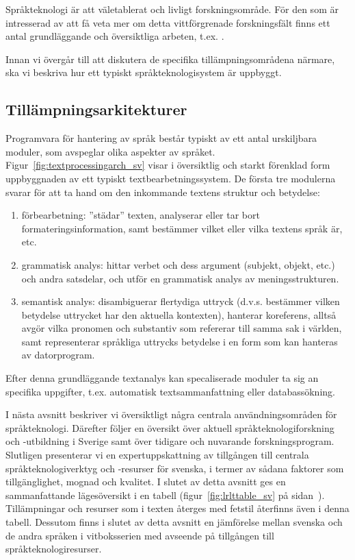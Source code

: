 \begin{multicols}{2}
Språkteknologi är att väletablerat och livligt forskningsområde. För
den som är intresserad av att få veta mer om detta vittförgrenade
forskningsfält finns ett antal grundläggande och översiktliga arbeten,
t.ex.
\cite{jurafsky-martin01,manning-schuetze1,lt-world1,lt-survey1}.

Innan vi övergår till att diskutera de specifika tillämpningsområdena
närmare, ska vi beskriva hur ett typiskt språkteknologisystem är
uppbyggt.


\subsection{Tillämpnings\-arkitekturer}

Programvara för hantering av språk består typiskt av ett antal
urskiljbara moduler, som avspeglar olika aspekter av
språket. Figur~\ref{fig:textprocessingarch_sv} visar i översiktlig och
starkt förenklad form uppbyggnaden av ett typiskt
textbearbetningssystem. De första tre modulerna svarar för att ta hand
om den inkommande textens struktur och betydelse: \\

\begin{enumerate}[itemsep=0pt,parsep=0pt]
\item förbearbetning: ''städar'' texten, analyserar eller tar bort
  formateringsinformation, samt bestämmer vilket eller vilka textens
  språk är, etc.
\item grammatisk analys: hittar verbet och dess argument (subjekt,
  objekt, etc.) och andra satsdelar, och utför en grammatisk analys av
  meningsstrukturen.
\item semantisk analys: disambiguerar flertydiga uttryck
  (d.v.s. bestämmer vilken betydelse uttrycket har den aktuella
  kontexten), hanterar koreferens, alltså avgör vilka pronomen och
  substantiv som refererar till samma sak i världen, samt
  representerar språkliga uttrycks betydelse i en form som kan
  hanteras av datorprogram.
\end{enumerate}

Efter denna grundläggande textanalys kan specaliserade moduler ta sig
an specifika uppgifter, t.ex. automatisk textsammanfattning eller
databassökning.

I nästa avsnitt beskriver vi översiktligt några centrala
användningsområden för språkteknologi. Därefter följer en översikt
över aktuell språkteknologiforskning och -utbildning i Sverige samt
över tidigare och nuvarande forskningsprogram. Slutligen presenterar
vi en expertuppskattning av tillgången till centrala
språkteknologiverktyg och -resurser för svenska, i termer av sådana
faktorer som tillgänglighet, mognad och kvalitet. I slutet av detta
avsnitt ges en sammanfattande lägesöversikt i en tabell
(figur~\ref{fig:lrlttable_sv} på
sidan~\pageref{fig:lrlttable_sv}). Tillämpningar och resurser som i
texten återges med fetstil återfinns även i denna tabell. Dessutom
finns i slutet av detta avsnitt en jämförelse mellan svenska och de
andra språken i vitboksserien med avseende på tillgången till
språkteknologiresurser.



\end{multicols}
